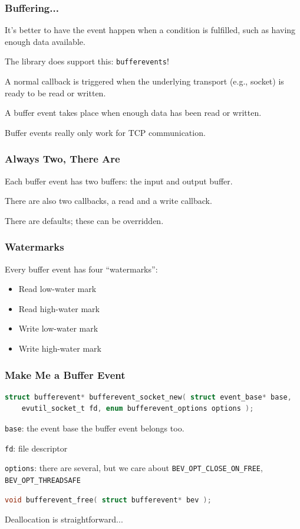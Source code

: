 \begin{frame}
\frametitle{Buffering...}

It's better to have the event happen when a condition is fulfilled, such as having enough data available.

The library does support this: \texttt{bufferevents}!

A normal callback is triggered when the underlying transport (e.g., socket) is ready to be read or written.

A buffer event takes place when enough data has been read or written.

Buffer events really only work for TCP communication.

\end{frame}


\begin{frame}
\frametitle{Always Two, There Are}

Each buffer event has two buffers: the input and output buffer.

There are also two callbacks, a read and a write callback.

There are defaults; these can be overridden.

\end{frame}


\begin{frame}
\frametitle{Watermarks}

Every buffer event has four ``watermarks'':
\begin{itemize}
	\item Read low-water mark
	\item Read high-water mark
	\item Write low-water mark
	\item Write high-water mark
\end{itemize}


\end{frame}


\begin{frame}[fragile]
\frametitle{Make Me a Buffer Event}

\begin{lstlisting}[language=C]
struct bufferevent* bufferevent_socket_new( struct event_base* base, 
    evutil_socket_t fd, enum bufferevent_options options );
\end{lstlisting}

\texttt{base}: the event base the buffer event belongs too.

\texttt{fd}: file descriptor

\texttt{options}: there are several, but we care about \texttt{BEV\_OPT\_CLOSE\_ON\_FREE}, \texttt{BEV\_OPT\_THREADSAFE}


\begin{lstlisting}[language=C]
void bufferevent_free( struct bufferevent* bev );
\end{lstlisting}

Deallocation is straightforward...
\end{frame}

